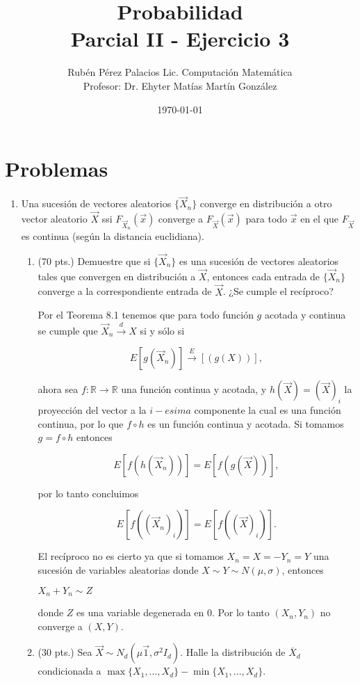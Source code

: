 \documentclass[letterpaper]{article}
\title{Probabilidad \\Parcial II - Ejercicio 3}
\author{Rubén Pérez Palacios Lic. Computación Matemática\\Profesor: Dr. Ehyter Matías Martín González}
\date{\today}
\theoremstyle{definition}
\theoremstyle{lemathm}
\theoremstyle{lemathm}
\theoremstyle{lemademthm}
\newcommand{\pars}[1]{\left( #1 \right) }
\newcommand{\bracs}[1]{\left[ #1 \right] }
\newcommand{\R}{\mathbb{R}}
\newcommand{\1}{\mathbbm{1}}
\begin{document}
	\maketitle
    
    \section*{Problemas}

    \begin{enumerate}
        
		\item Una sucesión de vectores aleatorios $\{\vec{X}_n\}$ converge en distribución a otro vector aleatorio $\vec{X}$ ssi $F_{\vec{X}_n}(\vec{x})$ converge a $F_{\vec{X}}(\vec{x})$ para todo $\vec{x}$ en el que $F_{\vec{X}}$ es continua (según la distancia euclidiana).
		
		\begin{enumerate}
		
			\item (70 pts.) Demuestre que si $\{\vec{X}_n\}$ es una sucesión de vectores aleatorios tales que convergen en distribución a $\vec{X}$, entonces cada entrada de $\{\vec{X}_n\}$ converge a la correspondiente entrada de $\vec{X}$. ¿Se cumple el recíproco?
			
			Por el Teorema 8.1 tenemos que para todo función $g$ acotada y continua se cumple que $\vec{X}_n \xrightarrow{d} X$ si y sólo si
			
			\[E\bracs{g\pars{\vec{X}_n}} \xrightarrow E\bracs{\pars{g(X)}},\]

			ahora sea $f:\R\to\R$ una función continua y acotada, y $h(\vec{X}) = \pars{\vec{X}}_i$ la proyección del vector a la $i-esima$ componente la cual es una función continua, por lo que $f\circ h$ es un función continua y acotada. Si tomamos $g=f\circ h$ entonces

			\[E\bracs{f\pars{h\pars{\vec{X}_n}}} = E\bracs{f\pars{g\pars{\vec{X}}}},\]

			por lo tanto concluimos

			\[E\bracs{f\pars{\pars{\vec{X}_n}_i}} = E\bracs{f\pars{\pars{\vec{X}}_i}}.\]

			El recíproco no es cierto ya que si tomamos $X_n = X = -Y_n = Y$ una sucesión de variables aleatorias donde $X \sim Y \sim N(\mu,\sigma)$, entonces 

			$X_n + Y_n \sim Z$
			
			donde $Z$ es una variable degenerada en 0. Por lo tanto $(X_n,Y_n)$ no converge a $(X,Y)$.

			\newpage

			\item (30 pts.) Sea $\vec{X}\sim N_d(\mu \vec{1},\sigma^2 I_d)$. Halle la distribución de $\overline{X}_d$ condicionada a $\max\{X_1,\dots,X_d\}-\min\{X_1,\dots,X_d\}$.
			

		\end{enumerate}

    \end{enumerate}

	
\end{document}

